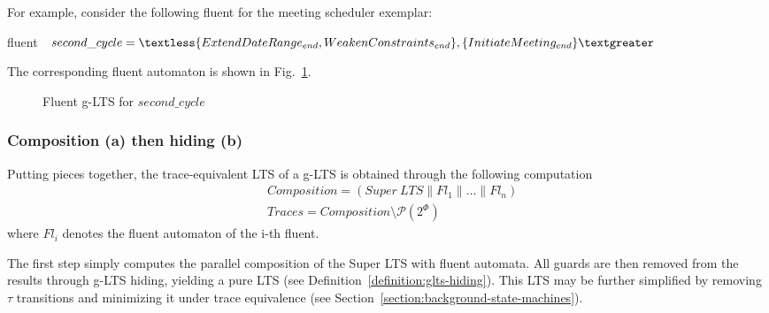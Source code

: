 For example, consider the following fluent for the meeting scheduler exemplar:
\begin{center}
fluent $second\_cycle = \textless \{ ExtendDateRange_{end}, \newline WeakenConstraints_{end} \},
 \{ InitiateMeeting_{end} \} \textgreater $\\
\end{center}

The corresponding fluent automaton is shown in Fig.~\ref{image:second-cycle-fluent-glts}.

\begin{figure}\centering
{}
\caption{Fluent g-LTS for $second\_cycle$\label{image:second-cycle-fluent-glts}}
\end{figure}

\subsubsection*{Composition (a) then hiding (b)}

Putting pieces together, the trace-equivalent LTS of a g-LTS is obtained through the following computation
\begin{align*}
&Composition = (Super~LTS \parallel Fl_1 \parallel \ldots \parallel Fl_n)\\
&Traces      = Composition \setminus \mathcal{P}(2^\Phi)
\end{align*}
where $Fl_i$ denotes the fluent automaton of the i-th fluent.

The first step simply computes the parallel composition of the Super LTS with fluent automata. All guards are then removed from the results through g-LTS hiding, yielding a pure LTS (see Definition~\ref{definition:glts-hiding}). This LTS may be further simplified by removing $\tau$ transitions and minimizing it under trace equivalence (see Section~\ref{section:background-state-machines}).

